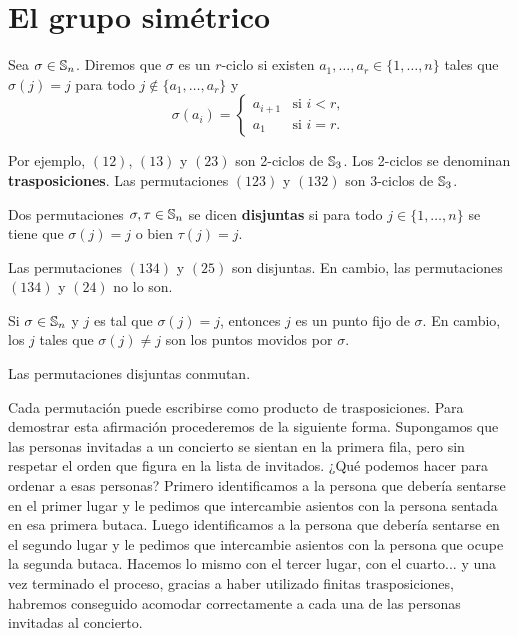 \chapter{El grupo simétrico}

Sea $\sigma\in\mathbb{S}_n$. Diremos que $\sigma$ es un $r$-ciclo si existen $a_1,\dots,a_r\in\{1,\dots,n\}$ tales que 
$\sigma(j)=j$ para todo $j\not\in\{a_1,\dots,a_r\}$ y 
\[
\sigma(a_i)=\begin{cases}
a_{i+1} & \text{si $i<r$},\\
a_1 & \text{si $i=r$}.	
\end{cases}
\]

\begin{examples}
Por ejemplo, $(12)$, $(13)$ y $(23)$ son 2-ciclos de $\mathbb{S}_3$. Los 2-ciclos se denominan \textbf{trasposiciones}. 
Las permutaciones $(123)$ y $(132)$ son 3-ciclos de $\mathbb{S}_3$.
\end{examples}

Dos permutaciones $\sigma,\tau\in\mathbb{S}_n$ se dicen \textbf{disjuntas} si para todo $j\in\{1,\dots,n\}$ 
se tiene que $\sigma(j)=j$ o bien $\tau(j)=j$. 

\begin{examples}
Las permutaciones $(134)$ y $(25)$ son disjuntas. En cambio, las permutaciones $(134)$ y $(24)$ no lo son. 	
\end{examples}

Si $\sigma\in\mathbb{S}_n$ y $j$ es tal que $\sigma(j)=j$, entonces $j$ es un punto fijo de $\sigma$. En cambio, los $j$ tales que
$\sigma(j)\ne j$ son los puntos movidos por $\sigma$. 

\begin{remark}
Las permutaciones disjuntas conmutan.
\end{remark}

\begin{remark}
Cada permutación puede escribirse como producto de trasposiciones. Para demostrar esta afirmación procederemos de la siguiente forma. Supongamos que las personas invitadas a un concierto se sientan en la primera fila, pero sin respetar el orden que figura en la lista de invitados. ¿Qué podemos hacer para ordenar a esas personas? Primero identificamos a la persona que debería sentarse en el primer lugar y le pedimos que intercambie asientos con la persona sentada en esa primera butaca. Luego identificamos a la persona que debería sentarse en el segundo lugar y le pedimos que intercambie asientos con la persona que ocupe la segunda butaca. Hacemos lo mismo con el tercer lugar, con el cuarto... y una vez terminado el proceso, gracias a haber utilizado finitas trasposiciones, habremos conseguido acomodar correctamente a cada una de las personas invitadas al concierto.  
\end{remark}

